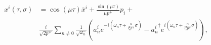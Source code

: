 \begin{equation}
\begin{aligned}
x^i(\tau, \sigma)& = \cos\left(\mu \tau \right) \bar{x}^i + 
                \frac{\sin\left(\mu \tau \right)}{\mu p^+}  p_i +   \\
&  \frac{i}{\sqrt{2 p^+}} 
  \sum_{n \neq 0} \frac{1}{\sqrt{\omega_n}} 
  \left(
  a_n^i e^{-i \left( \omega_n \tau + \frac{n}{l_s^2 p^+} \sigma \right)} -
  {a_n^i}^\dagger e^{i \left( \omega_n \tau + \frac{n}{l_s^2 p^+}  \sigma \right)}
  \right) ,
\end{aligned}
\end{equation}


